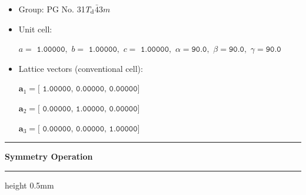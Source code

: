 \documentclass[fleqn,10pt,landscape]{jsarticle}
\begin{document}
\begin{itemize}
\item Group: PG No. 31\quad$T_{\rm d}$\quad$\bar{4}3m$\quad[ cubic ]
\end{itemize}
\begin{itemize}
\item Unit cell:

\quad $a=\texttt{ 1.00000},\,\, b=\texttt{ 1.00000},\,\, c=\texttt{ 1.00000},\,\, \alpha=\texttt{90.0},\,\, \beta=\texttt{90.0},\,\, \gamma=\texttt{90.0}$

\item Lattice vectors (conventional cell):

\quad $\bm{a}_1=\texttt{[ 1.00000, 0.00000, 0.00000]}$

\quad $\bm{a}_2=\texttt{[ 0.00000, 1.00000, 0.00000]}$

\quad $\bm{a}_3=\texttt{[ 0.00000, 0.00000, 1.00000]}$

\end{itemize}
\vspace{5mm}
\noindent \rule[0.5mm]{5mm}{0.5mm}\hspace{3mm}\textbf{Symmetry Operation}\hspace{3mm}\leaders\hrule height 0.5mm\hfill\kern0pt
\vspace{3mm}
\end{document}
